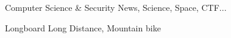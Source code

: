 

\begin{cventries}

  \begin{cvitems} %
    \item {Computer Science \& Security News, Science, Space, CTF...}
    \item {Longboard Long Distance, Mountain bike}
  \end{cvitems}

\end{cventries}
